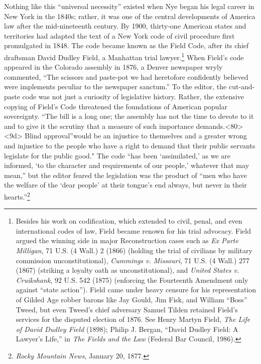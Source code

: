 \documentclass[12pt,]{article}
\let\rmarkdownfootnote\footnote%
\def\footnote{\protect\rmarkdownfootnote}
\begin{document}
Nothing like this ``universal necessity'' existed when Nye began his
legal career in New York in the 1840s; rather, it was one of the central
developments of America law after the mid-nineteenth century. By 1900,
thirty-one American states and territories had adapted the text of a New
York code of civil procedure first promulgated in 1848. The code became
known as the Field Code, after its chief draftsman David Dudley Field, a
Manhattan trial lawyer.\footnote{Besides his work on codification, which
  extended to civil, penal, and even international codes of law, Field
  became renown for his trial advocacy. Field argued the winning side in
  major Reconstruction cases such as \emph{Ex Parte Milligan}, 71 U.S.
  (4 Wall.) 2 (1866) (holding the trial of civilians by military
  commission unconstitutional), \emph{Cummings v. Missouri}, 71 U.S. (4
  Wall.) 277 (1867) (striking a loyalty oath as unconstitutional), and
  \emph{United States v. Cruikshank}, 92 U.S. 542 (1875) (enforcing the
  Fourteenth Amendment only against ``state action''). Field came under
  heavy censure for his representation of Gilded Age robber barons like
  Jay Gould, Jim Fisk, and William ``Boss'' Tweed, but even Tweed's
  chief adversary Samuel Tilden retained Field's services for the
  disputed election of 1876. See Henry Martyn Field, \emph{The Life of
  David Dudley Field} (1898); Philip J. Bergan, ``David Dudley Field: A
  Lawyer's Life,'' in \emph{The Fields and the Law} (Federal Bar
  Council, 1986).} When Field's code appeared in the Colorado assembly
in 1876, a Denver newspaper wryly commented, ``The scissors and
paste-pot we had heretofore confidently believed were implements
peculiar to the newspaper sanctum.'' To the editor, the cut-and-paste
code was not just a curiosity of legislative history. Rather, the
extensive copying of Field's Code threatened the foundations of American
popular sovereignty. ``The bill is a long one; the assembly has not the
time to devote to it and to give it the scrutiny that a measure of such
importance demands.\textless80\textgreater\textless9d\textgreater{}
Blind approval''would be an injustice to themselves and a greater wrong
and injustice to the people who have a right to demand that their public
servants legislate for the public good." The code ``has been
`assimilated,' as we are informed, `to the character and requirements of
our people,' whatever that may mean,'' but the editor feared the
legislation was the product of ``men who have the welfare of the `dear
people' at their tongue's end always, but never in their
hearts.''\footnote{\emph{Rocky Mountain News}, January 20, 1877.}
\end{document}
